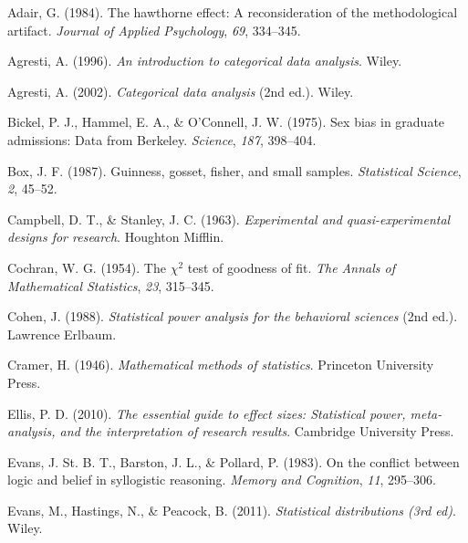 \documentclass[
  a4paper,
]{book}
\newlength{\cslhangindent}
\newlength{\cslentryspacingunit} %
\newenvironment{CSLReferences}[2] %
 {%
  \setlength{\parindent}{0pt}
  \ifodd #1
  \let\oldpar\par
  \def\par{\hangindent=\cslhangindent\oldpar}
  \fi
  \setlength{\parskip}{#2\cslentryspacingunit}
 }%
 {}
\begin{document}
\hypertarget{refs}{}
\begin{CSLReferences}{1}{0}
\leavevmode{}%
Adair, G. (1984). The hawthorne effect: A reconsideration of the
methodological artifact. \emph{Journal of Applied Psychology},
\emph{69}, 334--345.

\leavevmode{}%
Agresti, A. (1996). \emph{An introduction to categorical data analysis}.
Wiley.

\leavevmode{}%
Agresti, A. (2002). \emph{Categorical data analysis} (2nd ed.). Wiley.

\leavevmode{}%
Bickel, P. J., Hammel, E. A., \& O'Connell, J. W. (1975). Sex bias in
graduate admissions: Data from {B}erkeley. \emph{Science}, \emph{187},
398--404.

\leavevmode{}%
Box, J. F. (1987). Guinness, gosset, fisher, and small samples.
\emph{Statistical Science}, \emph{2}, 45--52.

\leavevmode{}%
Campbell, D. T., \& Stanley, J. C. (1963). \emph{Experimental and
quasi-experimental designs for research}. Houghton Mifflin.

\leavevmode{}%
Cochran, W. G. (1954). The \(\chi^2\) test of goodness of fit. \emph{The
Annals of Mathematical Statistics}, \emph{23}, 315--345.

\leavevmode{}%
Cohen, J. (1988). \emph{Statistical power analysis for the behavioral
sciences} (2nd ed.). Lawrence Erlbaum.

\leavevmode{}%
Cramer, H. (1946). \emph{Mathematical methods of statistics}. Princeton
University Press.

\leavevmode{}%
Ellis, P. D. (2010). \emph{The essential guide to effect sizes:
Statistical power, meta-analysis, and the interpretation of research
results}. Cambridge University Press.

\leavevmode{}%
Evans, J. St. B. T., Barston, J. L., \& Pollard, P. (1983). On the
conflict between logic and belief in syllogistic reasoning. \emph{Memory
and Cognition}, \emph{11}, 295--306.

\leavevmode{}%
Evans, M., Hastings, N., \& Peacock, B. (2011). \emph{Statistical
distributions (3rd ed)}. Wiley.


\end{CSLReferences}
\end{document}
